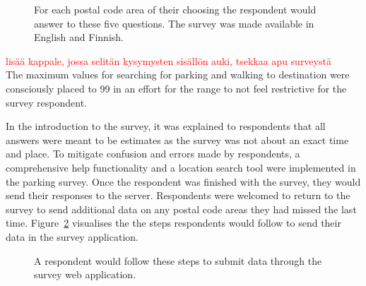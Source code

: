 \begin{figure}[H]%
    \centering
    \qquad
    \caption[Research survey questions in the web application]{For each postal code area of their choosing the respondent would answer to these five questions. The survey was made available in English and Finnish.}%
    \label{fig:js_survey_questions}%
\end{figure}

\textcolor{red}{lisää kappale, jossa selitän kysymysten sisällön auki, tsekkaa apu surveystä} \\ 
The maximum values for searching for parking and walking to destination were consciously placed to 99 in an effort for the range to not feel restrictive for the survey respondent.

In the introduction to the survey, it was explained to respondents that all answers were meant to be estimates as the survey was not about an exact time and place. To mitigate confusion and errors made by respondents, a comprehensive help functionality and a location search tool were implemented in the parking survey. Once the respondent was finished with the survey, they would send their responses to the server. Respondents were welcomed to return to the survey to send additional data on any postal code areas they had missed the last time. Figure~\ref{fig:survey_process} visualises the the steps respondents would follow to send their data in the survey application.

\begin{figure}[H]%
    \centering
    \quad
    \quad
    \quad
    \caption[Steps to fill out the survey]{A respondent would follow these steps to submit data through the survey web application.}%
    \label{fig:survey_process}%
\end{figure}

